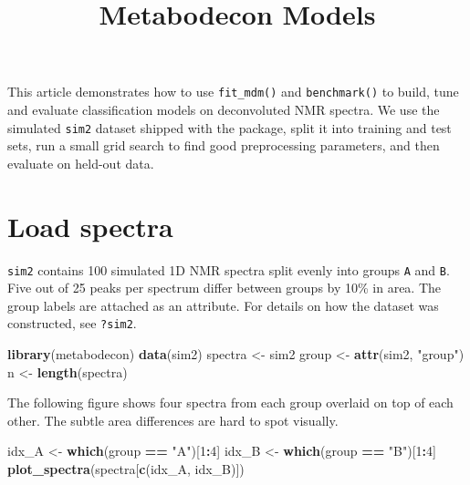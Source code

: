 \documentclass[
]{article}
\title{Metabodecon Models}
\author{}
\date{\vspace{-2.5em}}
\newenvironment{Shaded}{\begin{snugshade}}{\end{snugshade}}
\newcommand{\DecValTok}[1]{\textcolor[rgb]{0.00,0.00,0.81}{#1}}
\newcommand{\KeywordTok}[1]{\textcolor[rgb]{0.13,0.29,0.53}{\textbf{#1}}}
\newcommand{\NormalTok}[1]{#1}
\newcommand{\OperatorTok}[1]{\textcolor[rgb]{0.81,0.36,0.00}{\textbf{#1}}}
\newcommand{\StringTok}[1]{\textcolor[rgb]{0.31,0.60,0.02}{#1}}
\begin{document}
\maketitle

This article demonstrates how to use \texttt{fit\_mdm()} and
\texttt{benchmark()} to build, tune and evaluate classification models
on deconvoluted NMR spectra. We use the simulated \texttt{sim2} dataset
shipped with the package, split it into training and test sets, run a
small grid search to find good preprocessing parameters, and then
evaluate on held-out data.

\hypertarget{load-spectra}{%
\section{Load spectra}\label{load-spectra}}

\texttt{sim2} contains 100 simulated 1D NMR spectra split evenly into
groups \texttt{A} and \texttt{B}. Five out of 25 peaks per spectrum
differ between groups by 10\% in area. The group labels are attached as
an attribute. For details on how the dataset was constructed, see
\texttt{?sim2}.

\begin{Shaded}
\begin{Highlighting}[]
\KeywordTok{library}\NormalTok{(metabodecon)}
\KeywordTok{data}\NormalTok{(sim2)}
\NormalTok{spectra \textless{}{-}}\StringTok{ }\NormalTok{sim2}
\NormalTok{group \textless{}{-}}\StringTok{ }\KeywordTok{attr}\NormalTok{(sim2, }\StringTok{"group"}\NormalTok{)}
\NormalTok{n \textless{}{-}}\StringTok{ }\KeywordTok{length}\NormalTok{(spectra)}
\end{Highlighting}
\end{Shaded}

The following figure shows four spectra from each group overlaid on top
of each other. The subtle area differences are hard to spot visually.

\begin{Shaded}
\begin{Highlighting}[]
\NormalTok{idx\_A \textless{}{-}}\StringTok{ }\KeywordTok{which}\NormalTok{(group }\OperatorTok{==}\StringTok{ "A"}\NormalTok{)[}\DecValTok{1}\OperatorTok{:}\DecValTok{4}\NormalTok{]}
\NormalTok{idx\_B \textless{}{-}}\StringTok{ }\KeywordTok{which}\NormalTok{(group }\OperatorTok{==}\StringTok{ "B"}\NormalTok{)[}\DecValTok{1}\OperatorTok{:}\DecValTok{4}\NormalTok{]}
\KeywordTok{plot\_spectra}\NormalTok{(spectra[}\KeywordTok{c}\NormalTok{(idx\_A, idx\_B)])}
\end{Highlighting}
\end{Shaded}
\end{document}
